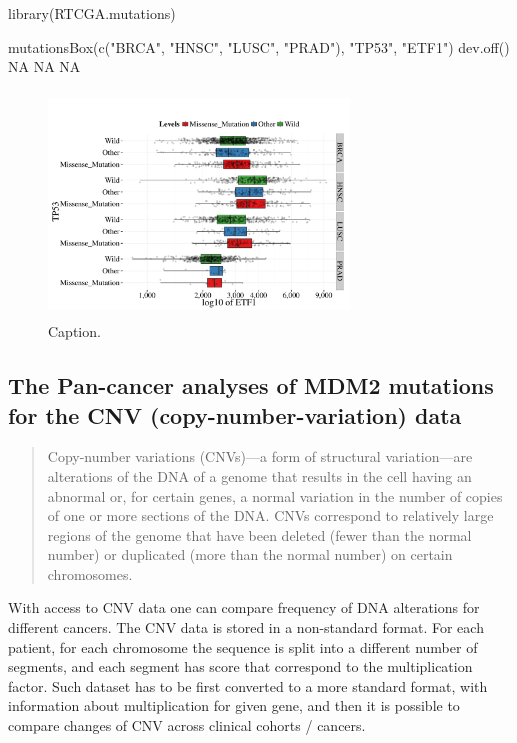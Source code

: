 \begin{Schunk}
\begin{Sinput}
library(RTCGA.mutations)
\end{Sinput}
\end{Schunk}

\begin{Schunk}
\begin{Sinput}
mutationsBox(c("BRCA", "HNSC", "LUSC", "PRAD"), "TP53", "ETF1")
dev.off()
NA
NA
NA
\end{Sinput}
\end{Schunk}

\begin{figure}[h!]
\begin{centering}
\includegraphics[width=8cm, height=6cm]{mutationsBox.pdf}
\caption{\label{figRes}Caption. }
\end{centering}
\end{figure}

\newpage

\subsection{The Pan-cancer analyses of MDM2 mutations for the CNV
(copy-number-variation)
data}\label{the-pan-cancer-analyses-of-mdm2-mutations-for-the-cnv-copy-number-variation-data}

\begin{quote}
Copy-number variations (CNVs)---a form of structural variation---are
alterations of the DNA of a genome that results in the cell having an
abnormal or, for certain genes, a normal variation in the number of
copies of one or more sections of the DNA. CNVs correspond to relatively
large regions of the genome that have been deleted (fewer than the
normal number) or duplicated (more than the normal number) on certain
chromosomes.
\end{quote}

With access to CNV data one can compare frequency of DNA alterations for
different cancers. The CNV data is stored in a non-standard format. For
each patient, for each chromosome the sequence is split into a different
number of segments, and each segment has score that correspond to the
multiplication factor. Such dataset has to be first converted to a more
standard format, with information about multiplication for given gene,
and then it is possible to compare changes of CNV across clinical
cohorts / cancers.

